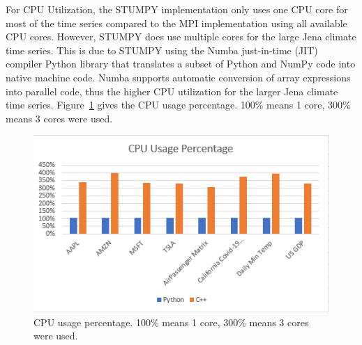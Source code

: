 \documentclass[conference]{IEEEtran}
\begin{document}

For CPU Utilization, the STUMPY implementation only uses one CPU core for most of the time series compared to the MPI implementation using all available CPU cores.  However, STUMPY does use multiple cores for the large Jena climate time series.  This is due to STUMPY using the Numba just-in-time (JIT) compiler Python library that translates a subset of Python and NumPy code into native machine code.  Numba supports automatic conversion of array expressions into parallel code\cite{Numba}, thus the higher CPU utilization for the larger Jena climate time series.  Figure~\ref{fig:CPU_Graph} gives the CPU usage percentage. 100\% means 1 core, 300\% means 3 cores were used.

\begin{figure}
\begin{center}
\includegraphics[scale=1.05]{CPU.png}
\caption{CPU usage percentage. 100\% means 1 core, 300\% means 3 cores were used.}
\label{fig:CPU_Graph}
\end{center}
\end{figure}
\end{document}
